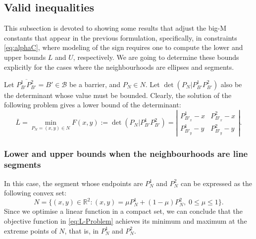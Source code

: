 \documentclass[a4paper,  review, authoryear, 1p.]{elsarticle}
\newcommand{\B}{{\mathcal B}}
\newcommand{\determinant}[3]{\det({#1|#2#3})}
\begin{document}
	\subsection{Valid inequalities}
	This subsection is devoted to showing some results that adjust the big-M constants that appear in the previous formulation, specifically, in constraints \eqref{eq:alphaC}, where modeling of the sign requires one to compute the lower and upper bounds $L$ and $U$, respectively. We are going to determine these bounds explicitly for the cases where the neighbourhoods are ellipses and segments.
	
	Let $\overline{P^1_{B'}P^2_{B'}}=B'\in\B$ be a barrier, and $P_N\in N$. Let $\determinant{P_N}{P_{B'}^1}{P_{B'}^2}$ also be the determinant whose value must be bounded. Clearly, the solution of the following problem gives a lower bound of the determinant:
	\begin{equation*}\label{eq:L-Problem}\tag{L-Problem}
		\overline{L}=\min_{P_N=(x,y)\in N}F(x,y):=\determinant{P^{}_N}{P_{B'}^1}{P_{B'}^2}=\left|
		\begin{array}{cc}
			P^{1}_{B'_x}-x & P^{2}_{B'_x}-x \\
			P^{1}_{B'_y}-y & P^{2}_{B'_y}-y
		\end{array}
		\right|.
	\end{equation*}
	
	\subsubsection{Lower and upper bounds when the neighbourhoods are line segments}
	In this case, the segment whose endpoints are $P^1_{N}$ and $P^2_{N}$ can be expressed as the following convex set:
	$$N=\{(x,y)\in\mathbb R^2:(x,y)=\mu P^1_{N}+(1-\mu)P^2_{N}, \; 0\leq\mu\leq1\}.$$
	Since we optimise a linear function in a compact set, we can conclude that the objective function in \eqref{eq:L-Problem} achieves its minimum and maximum at the extreme points of $N$, that is, in $P^1_{N}$ and $P^2_{N}$. 
	
\end{document}
